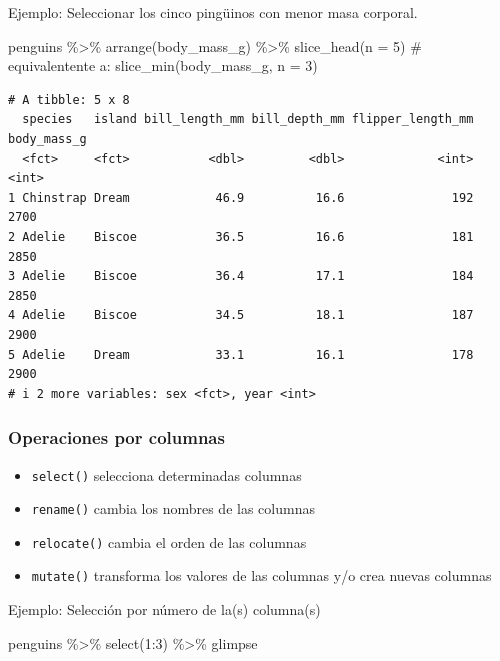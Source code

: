 \documentclass[
  letterpaper,
  DIV=11,
  numbers=noendperiod]{scrreprt}
\newenvironment{Shaded}{\begin{snugshade}}{\end{snugshade}}
\newcommand{\AttributeTok}[1]{\textcolor[rgb]{0.40,0.45,0.13}{#1}}
\newcommand{\CommentTok}[1]{\textcolor[rgb]{0.37,0.37,0.37}{#1}}
\newcommand{\DecValTok}[1]{\textcolor[rgb]{0.68,0.00,0.00}{#1}}
\newcommand{\FunctionTok}[1]{\textcolor[rgb]{0.28,0.35,0.67}{#1}}
\newcommand{\NormalTok}[1]{\textcolor[rgb]{0.00,0.23,0.31}{#1}}
\newcommand{\SpecialCharTok}[1]{\textcolor[rgb]{0.37,0.37,0.37}{#1}}
\begin{document}
{Ejemplo}: Seleccionar los cinco pingüinos con menor masa corporal.

\begin{Shaded}
\begin{Highlighting}[]
\NormalTok{penguins }\SpecialCharTok{\%\textgreater{}\%} 
  \FunctionTok{arrange}\NormalTok{(body\_mass\_g) }\SpecialCharTok{\%\textgreater{}\%} 
  \FunctionTok{slice\_head}\NormalTok{(}\AttributeTok{n =} \DecValTok{5}\NormalTok{)  }\CommentTok{\# equivalentente a: slice\_min(body\_mass\_g, n = 3)}
\end{Highlighting}
\end{Shaded}

\begin{verbatim}
# A tibble: 5 x 8
  species   island bill_length_mm bill_depth_mm flipper_length_mm body_mass_g
  <fct>     <fct>           <dbl>         <dbl>             <int>       <int>
1 Chinstrap Dream            46.9          16.6               192        2700
2 Adelie    Biscoe           36.5          16.6               181        2850
3 Adelie    Biscoe           36.4          17.1               184        2850
4 Adelie    Biscoe           34.5          18.1               187        2900
5 Adelie    Dream            33.1          16.1               178        2900
# i 2 more variables: sex <fct>, year <int>
\end{verbatim}

\subsubsection{\texorpdfstring{\textbf{Operaciones por
columnas}}{Operaciones por columnas}}\label{operaciones-por-columnas}

\begin{itemize}
\item
  \texttt{select()} selecciona determinadas columnas
\item
  \texttt{rename()} cambia los nombres de las columnas
\item
  \texttt{relocate()} cambia el orden de las columnas
\item
  \texttt{mutate()} transforma los valores de las columnas y/o crea
  nuevas columnas
\end{itemize}

{Ejemplo}: Selección por número de la(s) columna(s)

\begin{Shaded}
\begin{Highlighting}[]
\NormalTok{penguins }\SpecialCharTok{\%\textgreater{}\%} 
  \FunctionTok{select}\NormalTok{(}\DecValTok{1}\SpecialCharTok{:}\DecValTok{3}\NormalTok{) }\SpecialCharTok{\%\textgreater{}\%} 
\NormalTok{  glimpse}
\end{Highlighting}
\end{Shaded}
\end{document}
